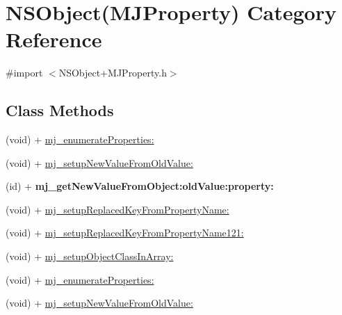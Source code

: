 \hypertarget{category_n_s_object_07_m_j_property_08}{}\section{N\+S\+Object(M\+J\+Property) Category Reference}
\label{category_n_s_object_07_m_j_property_08}


{\ttfamily \#import $<$N\+S\+Object+\+M\+J\+Property.\+h$>$}

\subsection*{Class Methods}
\begin{DoxyCompactItemize}
\item 
(void) + \mbox{\hyperlink{category_n_s_object_07_m_j_property_08_a7fd9ddf78a279a82eaac01b08f6d6a1c}{mj\+\_\+enumerate\+Properties\+:}}
\item 
(void) + \mbox{\hyperlink{category_n_s_object_07_m_j_property_08_a21b9a2a1d0a5d0c73fdeb7a5bbe953e8}{mj\+\_\+setup\+New\+Value\+From\+Old\+Value\+:}}
\item 
\mbox{\label{category_n_s_object_07_m_j_property_08_a65b32eb9f057b419969182da0816062b}} 
(id) + {\bfseries mj\+\_\+get\+New\+Value\+From\+Object\+:old\+Value\+:property\+:}
\item 
(void) + \mbox{\hyperlink{category_n_s_object_07_m_j_property_08_a1883e0f76733827afe0a1855d8bfb6f8}{mj\+\_\+setup\+Replaced\+Key\+From\+Property\+Name\+:}}
\item 
(void) + \mbox{\hyperlink{category_n_s_object_07_m_j_property_08_a65ca79a4eb9d05d554c0420b95afe471}{mj\+\_\+setup\+Replaced\+Key\+From\+Property\+Name121\+:}}
\item 
(void) + \mbox{\hyperlink{category_n_s_object_07_m_j_property_08_a7344a44c53e0991f3bbb1b199d47a4ea}{mj\+\_\+setup\+Object\+Class\+In\+Array\+:}}
\item 
(void) + \mbox{\hyperlink{category_n_s_object_07_m_j_property_08_a7fd9ddf78a279a82eaac01b08f6d6a1c}{mj\+\_\+enumerate\+Properties\+:}}
\item 
(void) + \mbox{\hyperlink{category_n_s_object_07_m_j_property_08_a21b9a2a1d0a5d0c73fdeb7a5bbe953e8}{mj\+\_\+setup\+New\+Value\+From\+Old\+Value\+:}}
\item 
\mbox{\label{category_n_s_object_07_m_j_property_08_a65b32eb9f057b419969182da0816062b}} 

\end{DoxyCompactItemize}
